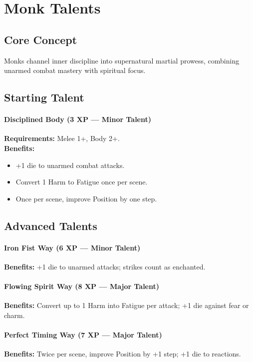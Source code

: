 \section{Monk Talents}
\label{sec:monk-talents}

\subsection*{Core Concept}
Monks channel inner discipline into supernatural martial prowess, combining unarmed combat mastery with spiritual focus.

\subsection*{Starting Talent}
\paragraph{Disciplined Body (3 XP --- Minor Talent)} 
\textbf{Requirements:} Melee 1+, Body 2+. \\
\textbf{Benefits:}
\begin{itemize}
  \item +1 die to unarmed combat attacks.
  \item Convert 1 Harm to Fatigue once per scene.
  \item Once per scene, improve Position by one step.
\end{itemize}

\subsection*{Advanced Talents}
\paragraph{Iron Fist Way (6 XP --- Minor Talent)} 
\textbf{Benefits:} +1 die to unarmed attacks; strikes count as enchanted.

\paragraph{Flowing Spirit Way (8 XP --- Major Talent)} 
\textbf{Benefits:} Convert up to 1 Harm into Fatigue per attack; +1 die against fear or charm.

\paragraph{Perfect Timing Way (7 XP --- Major Talent)} 
\textbf{Benefits:} Twice per scene, improve Position by +1 step; +1 die to reactions.

